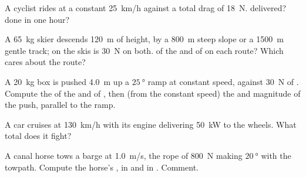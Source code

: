 \begin{exercise}[$\star\star$]\label{exo:g11:work-of-force:7}
A cyclist rides at a constant \qty{25}{km/h} against a total drag of
\qty{18}{N}.  delivered?  done in one hour?
\end{exercise}

\begin{exercise}[$\star\star$]\label{exo:g11:work-of-force:8}
A \qty{65}{kg} skier descends \qty{120}{m} of height, by a \qty{800}{m}
steep slope or a \qty{1500}{m} gentle track;  on the skis is
\qty{30}{N} on both.  of the  and of  on each route?
Which  cares about the route?
\end{exercise}

\begin{exercise}[$\star\star$]\label{exo:g11:work-of-force:9}
A \qty{20}{kg} box is pushed \qty{4.0}{m} up a $\qty{25}{\degree}$
ramp at constant speed, against \qty{30}{N} of . Compute the
 of the  and of , then (from the constant speed)
the  and magnitude of the push, parallel to the ramp.
\end{exercise}

\begin{exercise}[$\star\star$]\label{exo:g11:work-of-force:10}
A car cruises at \qty{130}{km/h} with its engine delivering
\qty{50}{kW} to the wheels. What total   does it fight?
\end{exercise}

\begin{exercise}[$\star\star$]\label{exo:g11:work-of-force:11}
A canal horse tows a barge at \qty{1.0}{m/s}, the rope of 
\qty{800}{N} making $\qty{20}{\degree}$ with the towpath. Compute the
horse's , in  and in . Comment.
\end{exercise}

